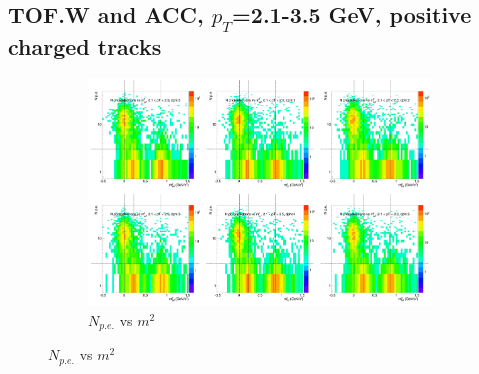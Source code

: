 \subsection{TOF.W and ACC, $p_T$=2.1-3.5 GeV, positive charged tracks}

\begin{figure}[H]
  \centering
    \begin{subfigure}{1\textwidth}
    \includegraphics[width=1\textwidth]{hiptfits/pos/PSaccthreshold_cent0_ich1_accfire0_ptbin8.jpg}
    \caption{$N_{p.e.}$ vs $m^2$}
    \end{subfigure}
\end{figure}
